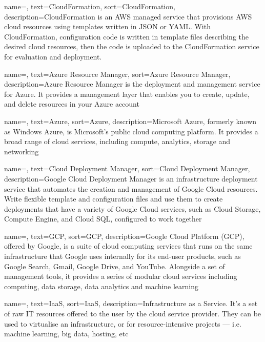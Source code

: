 {
    name=,
    text=CloudFormation,
    sort=CloudFormation,
    description={CloudFormation is an AWS managed service that provisions AWS cloud resources using templates written in JSON or YAML. With CloudFormation, configuration code is written in template files describing the desired cloud resources, then the code is uploaded to the CloudFormation service for evaluation and deployment.}
}

{
    name=,
    text=Azure Resource Manager,
    sort=Azure Resource Manager,
    description={Azure Resource Manager is the deployment and management service for Azure. It provides a management layer that enables you to create, update, and delete resources in your Azure account
    }
}

{
    name=,
    text=Azure,
    sort=Azure,
    description={Microsoft Azure, formerly known as Windows Azure, is Microsoft's public cloud computing platform. It provides a broad range of cloud services, including compute, analytics, storage and networking}
}

{
    name=,
    text=Cloud Deployment Manager,
    sort=Cloud Deployment Manager,
    description={Google Cloud Deployment Manager is an infrastructure deployment service that automates the creation and management of Google Cloud resources. Write flexible template and configuration files and use them to create deployments that have a variety of Google Cloud services, such as Cloud Storage, Compute Engine, and Cloud SQL, configured to work together}
}

{
    name=,
    text=GCP,
    sort=GCP,
    description={Google Cloud Platform (GCP), offered by Google, is a suite of cloud computing services that runs on the same infrastructure that Google uses internally for its end-user products, such as Google Search, Gmail, Google Drive, and YouTube. Alongside a set of management tools, it provides a series of modular cloud services including computing, data storage, data analytics and machine learning}
}

{
    name=,
    text=IaaS,
    sort=IaaS,
    description={Infrastructure as a Service. It's a set of raw IT resources offered to the user by the cloud service provider. They can be used to virtualise an infrastructure, or for resource-intensive projects — i.e. machine learning, big data, hosting, etc}
}

